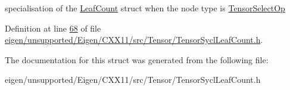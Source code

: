 specialisation of the \hyperlink{struct_eigen_1_1_tensor_sycl_1_1internal_1_1_leaf_count}{Leaf\+Count} struct when the node type is \hyperlink{class_eigen_1_1_tensor_select_op}{Tensor\+Select\+Op} 

Definition at line \hyperlink{eigen_2unsupported_2_eigen_2_c_x_x11_2src_2_tensor_2_tensor_sycl_leaf_count_8h_source_l00068}{68} of file \hyperlink{eigen_2unsupported_2_eigen_2_c_x_x11_2src_2_tensor_2_tensor_sycl_leaf_count_8h_source}{eigen/unsupported/\+Eigen/\+C\+X\+X11/src/\+Tensor/\+Tensor\+Sycl\+Leaf\+Count.\+h}.



The documentation for this struct was generated from the following file\+:\begin{DoxyCompactItemize}
\item 
eigen/unsupported/\+Eigen/\+C\+X\+X11/src/\+Tensor/\+Tensor\+Sycl\+Leaf\+Count.\+h\end{DoxyCompactItemize}
